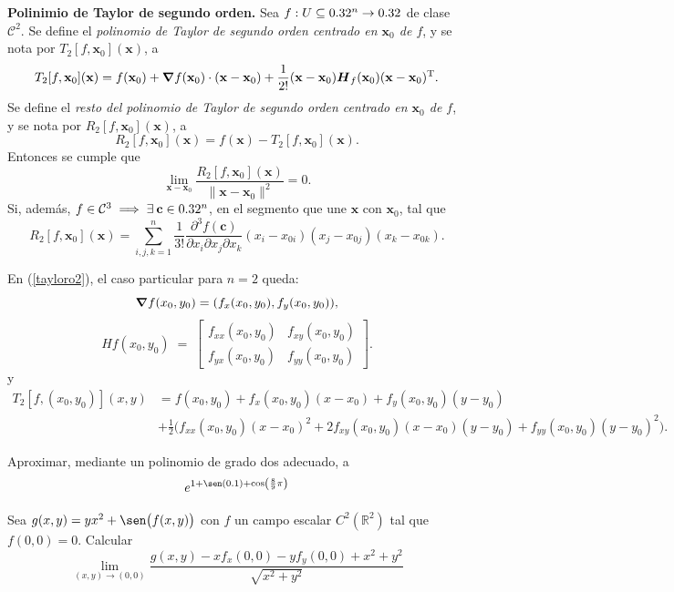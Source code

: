 \begin{theorem}\label{tayloro2} \textbf{Polinimio de Taylor de segundo orden.}  Sea $f:U\subseteq0.32^n\to0.32$ de clase $\mathcal{C}^2$. Se define el \emph{polinomio de Taylor de segundo orden centrado en $\mathbf{x}_0$ de $f$}, y se nota por $T_2[f,\mathbf{x}_0](\mathbf{x})$, a
  \[
    T_2[f,\mathbf{x}_0](\mathbf{x})=f(\mathbf{x}_0)+\grad{f}(\mathbf{x}_0)\cdot(\mathbf{x-x}_0)+\frac{1}{2!}(\mathbf{x-x}_0)\boldsymbol{H}_f(\mathbf{x}_0)(\mathbf{x-x}_0)^\text{T}.
  \]
  Se define el \emph{resto del polinomio de Taylor de segundo orden centrado en $\mathbf{x}_0$ de $f$}, y se nota por $R_2[f,\mathbf{x}_0](\mathbf{x})$, a
  \[
    R_2[f,\mathbf{x}_0](\mathbf{x})=f(\mathbf{x})-T_2[f,\mathbf{x}_0](\mathbf{x}).
  \]
  Entonces se cumple que
  \[
    \lim_{\mathbf{x-x}_0}\dfrac{R_2[f,\mathbf{x}_0](\mathbf{x})}{\|\mathbf{x-x}_0\|^2}=0.
  \]
  Si, adem\'as, $f\in\mathcal{C}^3\implies\exists\:\mathbf{c}\in0.32^n$, en el segmento que une $\mathbf{x}$ con $\mathbf{x}_0$, tal que
  \[
    R_2[f,\mathbf{x}_0](\mathbf{x})=\sum_{i,j,k=1}^{n}\frac{1}{3!}\dfrac{\partial^3 f(\mathbf{c})}{\partial x_i \partial x_j \partial x_k}(x_i-x_{0i})(x_j-x_{0j})(x_k-x_{0k}).
  \]
\end{theorem}

\begin{obs} En (\ref{tayloro2}), el caso particular para $n=2$ queda:   $$\grad{f}(x_0,y_0) = ( f_x(x_0,y_0), f_y(x_0,y_0)), $$
$$Hf(x_0,y_0) \;=\; 
\begin{bmatrix}
  f_{xx}(x_0,y_0) & f_{xy}(x_0,y_0) \\[6pt]
  f_{yx}(x_0,y_0) & f_{yy}(x_0,y_0)
\end{bmatrix}.
$$ y 
\begin{align*}
  T_2[f, (x_0,y_0)](x,y) &=   f(x_0,y_0)  + f_x(x_0,y_0)(x-x_0) + f_y(x_0,y_0)(y-y_0) \\
&+ \tfrac{1}{2}\Big( f_{xx}(x_0,y_0)(x-x_0)^2 + 2f_{xy}(x_0,y_0)(x-x_0)(y-y_0) + f_{yy}(x_0,y_0)(y-y_0)^2\Big).
\end{align*} 
\end{obs}

\begin{tarea} Aproximar, mediante un polinomio de grado dos adecuado, a
$$e^{1+\sen(0.1)+\cos\left(\frac{8}{9}\pi\right)}$$
\end{tarea}


\begin{tarea}
Sea $g(x,y)=yx^{2} + \sen\big(f(x,y)\big)$  con $f$  un campo escalar  $C^{2}(\mathbb{R}^{2})$ tal que $f(0,0)=0$. Calcular 
$$\lim_{(x,y)\rightarrow(0,0)} \dfrac{g(x,y) - xf_x(0,0) - yf_y(0,0)+x^{2}+y^{2}}{\sqrt{x^{2}+y^{2}} }$$
\end{tarea}




